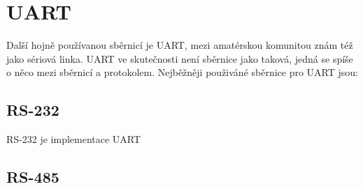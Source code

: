 \section{UART}
Další hojně používanou sběrnicí je UART, mezi amatérskou komunitou znám též jako sériová linka.
UART ve skutečnosti není sběrnice jako taková, jedná se spíše o něco mezi sběrnicí a protokolem.
Nejběžněji použiváné sběrnice pro UART jsou:
\subsection{RS-232} %
\label{sub:RS-232}
	RS-232 je implementace UART
\subsection{RS-485} %
\label{sub:RS-485}




